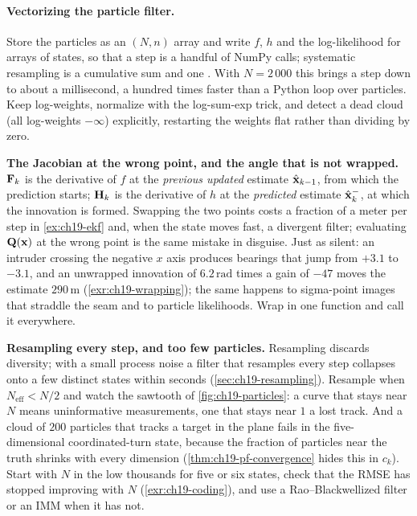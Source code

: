 \paragraph{Vectorizing the particle filter.}
Store the particles as an $(N, n)$ array and write $f$, $h$ and the
log-likelihood for arrays of states, so that a step is a handful of NumPy
calls; systematic resampling is a cumulative sum and one
. With $N = 2\,000$ this brings a step down to about a
millisecond, a hundred times faster than a Python loop over particles. Keep
log-weights, normalize with the log-sum-exp trick, and detect a dead cloud
(all log-weights $-\infty$) explicitly, restarting the weights flat rather
than dividing by zero.
\begin{pitfall}
\textbf{The Jacobian at the wrong point, and the angle that is not wrapped.}
$\mathbf{F}_k$ is the derivative of $f$ at the \emph{previous updated}
estimate $\hat{\mathbf{x}}_{k-1}$, from which the prediction starts; $\mathbf{H}_k$
is the derivative of $h$ at the \emph{predicted} estimate $\hat{\mathbf{x}}_k^-$,
at which the innovation is formed. Swapping the two points costs a fraction
of a meter per step in \cref{ex:ch19-ekf} and, when the state moves fast, a
divergent filter; evaluating $\mathbf{Q}(\mathbf{x})$ at the wrong point is the
same mistake in disguise. Just as silent: an intruder crossing the negative
$x$ axis produces bearings that jump from $+3.1$ to $-3.1$, and an unwrapped
innovation of $6.2\,\mathrm{rad}$ times a gain of $-47$ moves the estimate
$290\,\mathrm{m}$ (\cref{exr:ch19-wrapping}); the same happens to sigma-point
images that straddle the seam and to particle likelihoods. Wrap in one
function and call it everywhere.
\end{pitfall}

\begin{pitfall}
\textbf{Resampling every step, and too few particles.} Resampling discards
diversity; with a small process noise a filter that resamples every step
collapses onto a few distinct states within seconds
(\cref{sec:ch19-resampling}). Resample when $N_{\mathrm{eff}} < N/2$ and
watch the sawtooth of \cref{fig:ch19-particles}: a curve that stays near
$N$ means uninformative measurements, one that stays near $1$ a lost track.
And a cloud of $200$ particles that tracks a target in the plane fails in
the five-dimensional coordinated-turn state, because the fraction of
particles near the truth shrinks with every dimension
(\cref{thm:ch19-pf-convergence} hides this in $c_k$). Start with $N$ in the
low thousands for five or six states, check that the RMSE has stopped
improving with $N$ (\cref{exr:ch19-coding}), and use a Rao--Blackwellized
filter or an IMM when it has not.
\end{pitfall}

